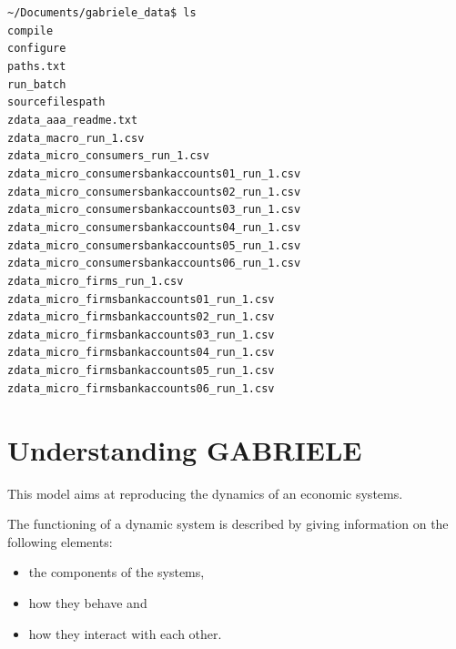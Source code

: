 \documentclass{book}
\begin{document}
\vskip2mm
\noindent\verb+~/Documents/gabriele_data$ +\color{red}\verb|ls| \\ \color{green}
\verb+compile+ \\
\verb+configure+ \\ \color{blue}
\verb+paths.txt+ \\ \color{green}
\verb+run_batch+ \\ \color{blue}
\verb+sourcefilespath+ \\
\verb+zdata_aaa_readme.txt+ \\
\verb+zdata_macro_run_1.csv+ \\
\verb+zdata_micro_consumers_run_1.csv+ \\
\verb+zdata_micro_consumersbankaccounts01_run_1.csv+ \\
\verb+zdata_micro_consumersbankaccounts02_run_1.csv+ \\
\verb+zdata_micro_consumersbankaccounts03_run_1.csv+ \\
\verb+zdata_micro_consumersbankaccounts04_run_1.csv+ \\
\verb+zdata_micro_consumersbankaccounts05_run_1.csv+ \\
\verb+zdata_micro_consumersbankaccounts06_run_1.csv+ \\
\verb+zdata_micro_firms_run_1.csv+ \\
\verb+zdata_micro_firmsbankaccounts01_run_1.csv+ \\
\verb+zdata_micro_firmsbankaccounts02_run_1.csv+ \\
\verb+zdata_micro_firmsbankaccounts03_run_1.csv+ \\
\verb+zdata_micro_firmsbankaccounts04_run_1.csv+ \\
\verb+zdata_micro_firmsbankaccounts05_run_1.csv+ \\
\verb+zdata_micro_firmsbankaccounts06_run_1.csv+ \\
\vskip2mm
\color{black}


\part{Understanding GABRIELE}

This model aims at reproducing the dynamics of an economic systems.

The functioning of a dynamic system is described by giving information on the following elements:
\begin{itemize}
	\item the components of the systems, 
	\item how they behave and 
	\item how they interact with each other. 
\end{itemize}
\end{document}
